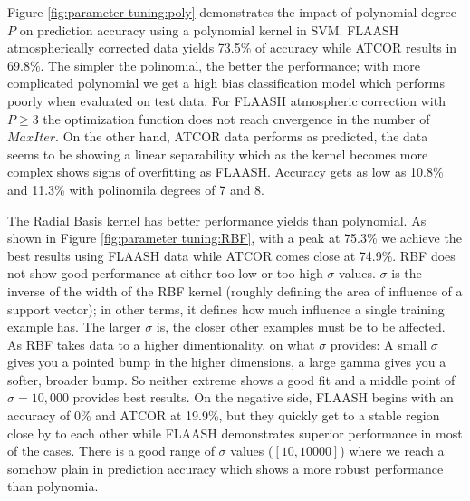 \documentclass[remotesensing,article,accept,moreauthors,pdftex,12pt,a4paper]{mdpi}
\begin{document}
Figure \ref{fig:parameter tuning:poly} demonstrates the impact of polynomial degree $P$ on prediction accuracy using a polynomial kernel in SVM. 
FLAASH atmospherically corrected data yields 73.5\% of accuracy while ATCOR results in 69.8\%.
The simpler the polinomial, the better the performance; with more complicated polynomial we get a high bias classification model which performs poorly when evaluated on test data.
For FLAASH atmospheric correction with $P \geq 3$ the optimization function does not reach cnvergence in the number of $MaxIter$. 
On the other hand, ATCOR data performs as predicted, the data seems to be showing a linear separability which as the kernel becomes more complex shows signs of overfitting as FLAASH.
Accuracy gets as low as 10.8\% and 11.3\% with polinomila degrees of 7 and 8.

The Radial Basis kernel has better performance yields than polynomial.
As shown in Figure \ref{fig:parameter tuning:RBF}, with a peak at 75.3\% we achieve the best results using FLAASH data while ATCOR comes close at 74.9\%.
RBF does not show good performance at either too low or too high $\sigma$ values.
$\sigma$ is the inverse of the width of the RBF kernel (roughly defining the area of influence of a support vector); 
in other terms, it defines how much influence a single training example has.
The larger $\sigma$ is, the closer other examples must be to be affected.
As RBF takes data to a higher dimentionality, on what $\sigma$ provides:
A small $\sigma$ gives you a pointed bump in the higher dimensions, a large gamma gives you a softer, broader bump.
So neither extreme shows a good fit and a middle point of $\sigma=10,000$ provides best results.
On the negative side, FLAASH begins with an accuracy of 0\% and ATCOR at 19.9\%, but they quickly get to a stable region close by to each other while FLAASH demonstrates superior performance in most of the cases.
There is a good range of $\sigma$ values ($[10, 10000]$) where we reach a somehow plain in prediction accuracy which shows a more robust performance than polynomia. 
\end{document}
